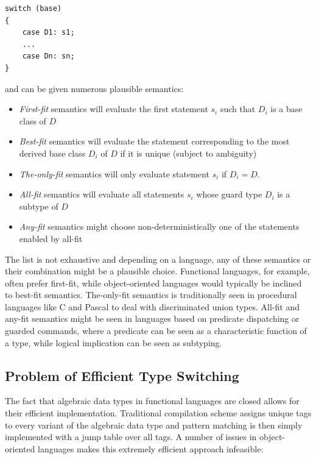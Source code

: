 \documentclass[preprint]{sigplanconf}
\begin{document}
\begin{lstlisting}
switch (base)
{
    case D1: s1;
    ...
    case Dn: sn;
}
\end{lstlisting}

\noindent and can be given numerous plausible semantics:

\begin{itemize}
\item \emph{First-fit} semantics will evaluate the first statement $s_i$ such 
      that $D_i$ is a base class of $D$
\item \emph{Best-fit} semantics will evaluate the statement corresponding to the 
      most derived base class $D_i$ of $D$ if it is unique (subject to 
      ambiguity)
\item \emph{The-only-fit} semantics will only evaluate statement $s_i$ if $D_i=D$.
\item \emph{All-fit} semantics will evaluate all statements $s_i$ whose guard 
      type $D_i$ is a subtype of $D$
\item \emph{Any-fit} semantics might choose non-deterministically one of the 
      statements enabled by all-fit
\end{itemize}

The list is not exhaustive and depending on a language, any of these semantics 
or their combination might be a plausible choice. Functional languages, for 
example, often prefer first-fit, while object-oriented languages would typically 
be inclined to best-fit semantics. The-only-fit semantics is traditionally seen 
in procedural languages like C and Pascal to deal with discriminated union types. 
All-fit and any-fit semantics might be seen in languages based on predicate 
dispatching\cite{ErnstKC98} or guarded commands\cite{EWD:EWD472}, where a 
predicate can be seen as a characteristic function of a type, while logical 
implication can be seen as subtyping.

\subsection{Problem of Efficient Type Switching}
\label{sec:poets}

The fact that algebraic data types in functional languages are closed allows for 
their efficient implementation. Traditional compilation scheme assigns unique 
tags to every variant of the algebraic data type and pattern matching is then 
simply implemented with a jump table over all tags. A number of issues in 
object-oriented languages makes this extremely efficient approach infeasible:
\end{document}
